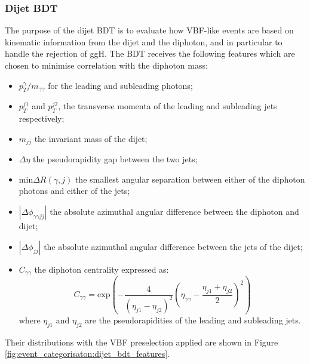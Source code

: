 \subsubsection{Dijet BDT}
The purpose of the dijet BDT is to evaluate how VBF-like events are based on kinematic information from the dijet and the diphoton, and in particular to handle the rejection of ggH.
The BDT receives the following features which are chosen to minimise correlation with the diphoton mass:
\begin{itemize}[noitemsep]
    \item $p^{\gamma}_{T}/m_{\gamma\gamma}$ for the leading and subleading photons;
    \item $p_{T}^{j1}$ and $p_{T}^{j2}$, the transverse momenta of the leading and subleading jets respectively;
    \item $m_{jj}$ the invariant mass of the dijet;
    \item $\Delta\eta$ the pseudorapidity gap between the two jets;
    \item $\mathrm{min}\Delta{R}(\gamma,j)$ the smallest angular separation between either of the diphoton photons and either of the jets;
    \item $|\Delta\phi_{\gamma\gamma{jj}}|$ the absolute azimuthal angular difference between the diphoton and dijet;
    \item $|\Delta\phi_{jj}|$ the absolute azimuthal angular difference between the jets of the dijet;
    \item $C_{\gamma\gamma}$ the diphoton centrality expressed as:
        \begin{equation}
            C_{\gamma\gamma} = \mathrm{exp}\left(-\frac{4}{(\eta_{j1} - \eta_{j2})^{2}}\left( \eta_{\gamma\gamma} - \frac{\eta_{j1} + \eta_{j2}}{2} \right)^{2}\right)
        \end{equation}
        where $\eta_{j1}$ and $\eta_{j2}$ are the pseudorapidities of the leading and subleading jets.
\end{itemize}
Their distributions with the VBF preselection applied are shown in Figure \ref{fig:event_categorisaton:dijet_bdt_features}.
\newpage
